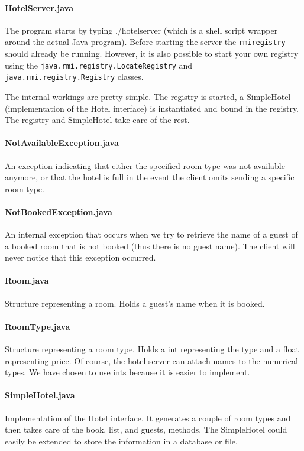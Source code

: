 \documentclass[a4paper,10pt]{article}
\begin{document}
\paragraph{HotelServer.java}
The program starts by typing ./hotelserver (which is a shell script wrapper around the actual Java program). Before starting the server the \texttt{rmiregistry} should already be running. However, it is also possible to start your own registry using the \texttt{java.rmi.registry.LocateRegistry} and \texttt{java.rmi.registry.Registry} classes.

The internal workings are pretty simple. The registry is started, a SimpleHotel (implementation of the Hotel interface) is instantiated and bound in the registry. The registry and SimpleHotel take care of the rest. 

\paragraph{NotAvailableException.java}
An exception indicating that either the specified room type was not available anymore, or that the hotel is full in the event the client omits sending a specific room type.

\paragraph{NotBookedException.java}
An internal exception that occurs when we try to retrieve the name of a guest of a booked room that is not booked (thus there is no guest name). The client will never notice that this exception occurred.

\paragraph{Room.java}
Structure representing a room. Holds a guest's name when it is booked.

\paragraph{RoomType.java}
Structure representing a room type. Holds a int representing the type and a float representing price. Of course, the hotel server can attach names to the numerical types. We have chosen to use ints because it is easier to implement.

\paragraph{SimpleHotel.java}
Implementation of the Hotel interface. It generates a couple of room types and then takes care of the book, list, and guests, methods. The SimpleHotel could easily be extended to store the information in a database or file.
\end{document}
